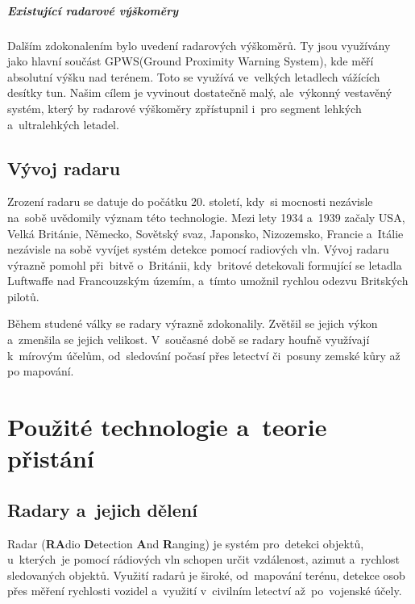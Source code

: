 		\paragraph{Existující radarové výškoměry}
		Dalším zdokonalením bylo uvedení radarových výškoměrů. Ty jsou využívány jako hlavní součást GPWS(Ground Proximity Warning System), kde měří absolutní výšku nad terénem. Toto se využívá ve~velkých letadlech vážících desítky tun. Našim cílem je vyvinout dostatečně malý, ale~výkonný vestavěný systém, který by radarové výškoměry zpřístupnil i~pro segment lehkých a~ultralehkých letadel.
	
	\section{Vývoj radaru}
		Zrození radaru se datuje do počátku 20. století, kdy~si mocnosti nezávisle na~sobě uvědomily význam této technologie. Mezi lety 1934 a~1939 začaly USA, Velká Británie, Německo, Sovětský svaz, Japonsko, Nizozemsko, Francie a~Itálie nezávisle na sobě vyvíjet systém detekce pomocí radiových vln.\cite{history::radar} Vývoj radaru výrazně pomohl při~bitvě o~Británii, kdy~britové detekovali formující se letadla Luftwaffe nad Francouzským územím, a~tímto umožnil rychlou odezvu Britských pilotů.\par
			
		Během studené války se radary výrazně zdokonalily. Zvětšil se jejich výkon a~zmenšila se jejich velikost. V~současné době se radary houfně využívají k~mírovým účelům, od~sledování počasí přes letectví či~posuny zemské kůry až po mapování.
		
\chapter{Použité technologie a~teorie přistání}
	
	\section{Radary a~jejich dělení}\label{uvod::radary}
		Radar (\textbf{RA}dio \textbf{D}etection \textbf{A}nd \textbf{R}anging) je systém pro~detekci objektů, u~kterých~je pomocí rádiových vln schopen určit vzdálenost, azimut a~rychlost sledovaných objektů. Využití radarů je široké, od~mapování terénu, detekce osob přes měření rychlosti vozidel a~využití v~civilním letectví až~po~vojenské účely.	
			
